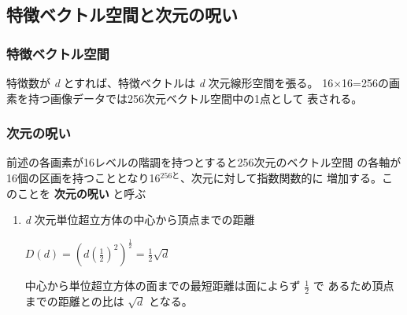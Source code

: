\documentclass[11pt]{article}
\begin{document}
\subsection{特徴ベクトル空間と次元の呪い}
\label{sec:orgheadline7}
\subsubsection{特徴ベクトル空間}
\label{sec:orgheadline4}
特徴数が \emph{d} とすれば、特徴ベクトルは \emph{d} 次元線形空間を張る。
16×16=256の画素を持つ画像データでは256次元ベクトル空間中の1点として
表される。
\subsubsection{次元の呪い}
\label{sec:orgheadline6}
前述の各画素が16レベルの階調を持つとすると256次元のベクトル空間
の各軸が16個の区画を持つこととなり16\(^{\text{256と}}\)、次元に対して指数関数的に
増加する。このことを \textbf{次元の呪い} と呼ぶ
\begin{enumerate}
\item \emph{d} 次元単位超立方体の中心から頂点までの距離
\label{sec:orgheadline5}
\begin{center}
$D(d)=(d(\frac{1}{2})^2)^{\frac{1}{2}}=\frac{1}{2}\sqrt{d}$
\end{center}

中心から単位超立方体の面までの最短距離は面によらず \(\frac{1}{2}\) で
あるため頂点までの距離との比は \(\sqrt{d}\) となる。
\end{enumerate}
\end{document}
